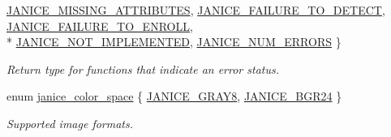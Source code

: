 \begin{DoxyCompactItemize}
\hyperlink{group__janice_gga4873d49c1f9d6a6880dfbd485cf6ba72a3769c1a562e8b70e94b183cfeabc2d66}{J\+A\+N\+I\+C\+E\+\_\+\+M\+I\+S\+S\+I\+N\+G\+\_\+\+A\+T\+T\+R\+I\+B\+U\+T\+E\+S}, 
\hyperlink{group__janice_gga4873d49c1f9d6a6880dfbd485cf6ba72a4123e451be0cc17446e73331a5886749}{J\+A\+N\+I\+C\+E\+\_\+\+F\+A\+I\+L\+U\+R\+E\+\_\+\+T\+O\+\_\+\+D\+E\+T\+E\+C\+T}, 
\hyperlink{group__janice_gga4873d49c1f9d6a6880dfbd485cf6ba72ad318d25055b2f4457f326c7243f87983}{J\+A\+N\+I\+C\+E\+\_\+\+F\+A\+I\+L\+U\+R\+E\+\_\+\+T\+O\+\_\+\+E\+N\+R\+O\+L\+L}, 
\\*
\hyperlink{group__janice_gga4873d49c1f9d6a6880dfbd485cf6ba72a8f3eea0e95a4ef4292306bf370a82b7e}{J\+A\+N\+I\+C\+E\+\_\+\+N\+O\+T\+\_\+\+I\+M\+P\+L\+E\+M\+E\+N\+T\+E\+D}, 
\hyperlink{group__janice_gga4873d49c1f9d6a6880dfbd485cf6ba72a6a81ece74f71417fcdb5ad558b57dcbb}{J\+A\+N\+I\+C\+E\+\_\+\+N\+U\+M\+\_\+\+E\+R\+R\+O\+R\+S}
 \}\begin{DoxyCompactList}\small\item\em Return type for functions that indicate an error status. \end{DoxyCompactList}
\item 
enum \hyperlink{group__janice_ga4040c8aa81857fc2102f27cf34cd973e}{janice\+\_\+color\+\_\+space} \{ \hyperlink{group__janice_gga4040c8aa81857fc2102f27cf34cd973eacd24e66ad3d44f6e65ba0e1d55719d7b}{J\+A\+N\+I\+C\+E\+\_\+\+G\+R\+A\+Y8}, 
\hyperlink{group__janice_gga4040c8aa81857fc2102f27cf34cd973ea45503c486c3f4d472d838e5d8ba9e4f4}{J\+A\+N\+I\+C\+E\+\_\+\+B\+G\+R24}
 \}\begin{DoxyCompactList}\small\item\em Supported image formats. \end{DoxyCompactList}
\end{DoxyCompactItemize}
